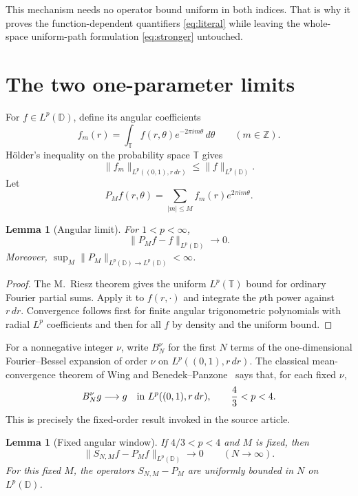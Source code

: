 \documentclass[11pt]{article}
\newtheorem{lemma}[theorem]{Lemma}
\newcommand{\D}{\mathbb D}
\newcommand{\T}{\mathbb T}
\newcommand{\Z}{\mathbb Z}
\begin{document}
This mechanism needs no operator bound uniform in both indices.  That is why
it proves the function-dependent quantifiers \eqref{eq:literal} while leaving
the whole-space uniform-path formulation \eqref{eq:stronger} untouched.

\section{The two one-parameter limits}

For $f\in L^p(\D)$, define its angular coefficients
\[
 f_m(r)=\int_{\T} f(r,\theta)e^{-2\pi i m\theta}\,d\theta
 \qquad(m\in\Z).
\]
H\"older's inequality on the probability space $\T$ gives
\begin{equation}\label{eq:coeffcontract}
 \|f_m\|_{L^p((0,1),r\,dr)}\le \|f\|_{L^p(\D)}.
\end{equation}
Let
\begin{equation}\label{eq:angular}
 P_Mf(r,\theta)=\sum_{|m|\le M}f_m(r)e^{2\pi i m\theta}.
\end{equation}

\begin{lemma}[Angular limit]\label{lem:angular}
For $1<p<\infty$,
\[
 \|P_Mf-f\|_{L^p(\D)}\longrightarrow0.
\]
Moreover, $\sup_M\|P_M\|_{L^p(\D)\to L^p(\D)}<\infty$.
\end{lemma}

\begin{proof}
The M.~Riesz theorem gives the uniform $L^p(\T)$ bound for ordinary Fourier
partial sums.  Apply it to $f(r,\cdot)$ and integrate the $p$th power against
$r\,dr$.  Convergence follows first for finite angular trigonometric
polynomials with radial $L^p$ coefficients and then for all $f$ by density
and the uniform bound.
\end{proof}

For a nonnegative integer $\nu$, write $B_N^{\nu}$ for the first $N$ terms
of the one-dimensional Fourier--Bessel expansion of order $\nu$ on
$L^p((0,1),r\,dr)$.  The classical mean-convergence theorem of
Wing and Benedek--Panzone~\cite{wing,benedek} says that, for each fixed
$\nu$,
\begin{equation}\label{eq:radialclassical}
 B_N^{\nu}g\longrightarrow g
 \quad\hbox{in }L^p((0,1),r\,dr),
 \qquad \frac43<p<4.
\end{equation}
This is precisely the fixed-order result invoked in the source article.

\begin{lemma}[Fixed angular window]\label{lem:fixedM}
If $4/3<p<4$ and $M$ is fixed, then
\[
 \|S_{N,M}f-P_Mf\|_{L^p(\D)}\longrightarrow0
 \qquad(N\to\infty).
\]
For this fixed $M$, the operators $S_{N,M}-P_M$ are uniformly bounded in
$N$ on $L^p(\D)$.
\end{lemma}
\end{document}
